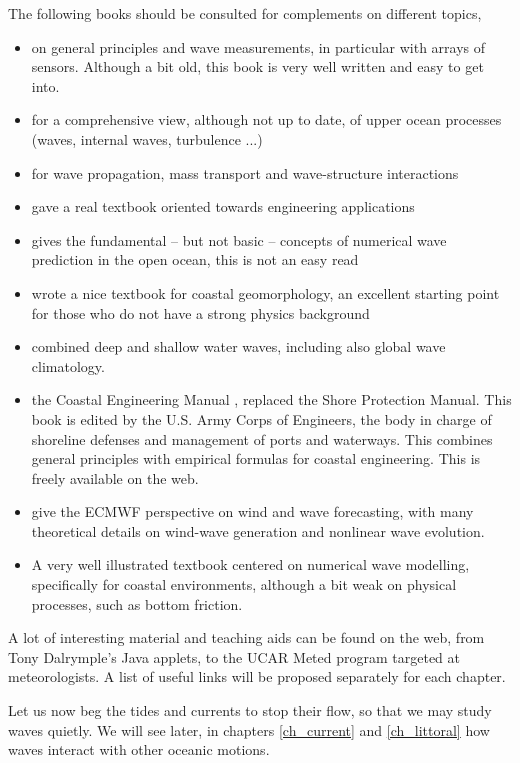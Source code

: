 The following books should be consulted for complements on different topics, 
\begin{itemize}
\item \cite{Kinsman1965} on general principles and wave measurements, in particular with arrays of sensors. Although a bit 
old, this book is very well written and easy to get into. 
\item \cite{Phillips1977} for a comprehensive view, although not up to date, of upper ocean processes (waves, internal waves, turbulence ...) 
\item \cite{Mei1989} for wave propagation, mass transport and wave-structure interactions
\item \cite{Dean&Dalrymple1991} gave a real textbook oriented towards engineering applications
\item \cite{WAMBook} gives the fundamental -- but not basic -- concepts of numerical wave prediction 
in the open ocean, this is not an easy read
\item \cite{Komar1998} wrote a nice textbook for coastal geomorphology, an excellent starting point for those 
who do not have a strong physics background
\item \cite{Young1999}  combined deep and shallow water waves, including also global wave climatology. 
\item the Coastal Engineering Manual \citep{USACE2002}, replaced the Shore Protection Manual. This book 
is edited by the U.S. Army Corps of Engineers, the body in charge of shoreline defenses and management of 
ports and waterways. This combines general principles with empirical formulas for coastal engineering. This is 
freely available on the web. 
\item \cite{Janssen2004} give the ECMWF perspective on wind and wave forecasting, with many theoretical details on wind-wave 
generation and nonlinear wave evolution. 
\item \cite{Holthuijsen2007} A very well illustrated textbook centered on numerical wave modelling, specifically for coastal 
environments, although a bit weak on physical processes, such as bottom friction.  
\end{itemize}
A lot of interesting material and teaching aids can be found on the web, from Tony Dalrymple's Java applets, to the UCAR Meted program 
targeted at meteorologists. A list of useful links will be proposed separately for each chapter. 

Let us now beg the tides and currents to stop their flow, so that we may study waves quietly. We will see later, in chapters \ref{ch_current} and 
\ref{ch_littoral} how waves interact with other oceanic motions. 


